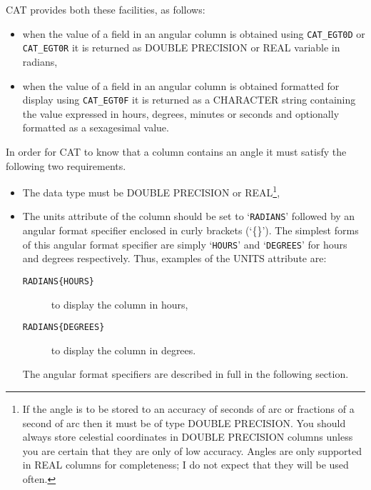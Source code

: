 \documentclass[11pt,twoside]{starlink}
\begin{document}
CAT provides both these facilities, as follows:

\begin{itemize}

  \item when the value of a field in an angular column is
   obtained using \texttt{CAT\_EGT0D} or \texttt{CAT\_EGT0R} it is
   returned as DOUBLE PRECISION or REAL variable in radians,

  \item when the value of a field in an angular column is
   obtained formatted for display using \texttt{CAT\_EGT0F} it is
   returned as a CHARACTER string containing the value expressed in
   hours, degrees, minutes or seconds and optionally formatted as a
   sexagesimal value.

\end{itemize}

In order for CAT to know that a column contains an angle it must
satisfy the following two requirements.

\begin{itemize}

  \item The data type must be DOUBLE PRECISION or
   REAL\footnote{If the angle is to be stored to an accuracy of
   seconds of arc or fractions of a second of arc then it must be
   of type DOUBLE PRECISION. You should always store celestial
   coordinates in DOUBLE PRECISION columns unless you are certain
   that they are only of low accuracy. Angles are only supported in
   REAL columns for completeness; I do not expect that they will be
   used often.},

  \item The units attribute of the column should be set to
   `\texttt{RADIANS}' followed by an angular format specifier
   enclosed in curly brackets (`\{\}'). The simplest forms of this
   angular format specifier are simply `\texttt{HOURS}' and `\texttt{DEGREES}' for hours and degrees respectively. Thus, examples of
   the UNITS attribute are:

  \begin{description}

    \item[\texttt{RADIANS\{HOURS\}}] to display the column in hours,

    \item[\texttt{RADIANS\{DEGREES\}}] to display the column in degrees.

  \end{description}

   The angular format specifiers are described in full in the following
   section.

\end{itemize}
\end{document}
